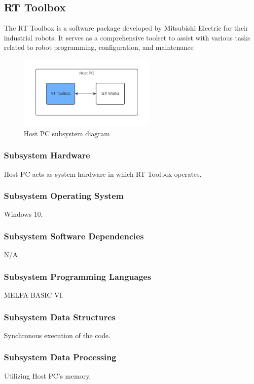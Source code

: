 \subsection{RT Toolbox}
The RT Toolbox is a software package developed by Mitsubishi Electric for their industrial robots. It serves as a comprehensive toolset to assist with various tasks related to robot programming, configuration, and maintenance

\begin{figure}[h!]
	\centering
 	\includegraphics[width=0.60\textwidth]{images/RT_toolbox_Host.png}
 \caption{Host PC subsystem diagram}
\end{figure}

\subsubsection{Subsystem Hardware}
Host PC acts as system hardware in which RT Toolbox operates.

\subsubsection{Subsystem Operating System}
Windows 10.

\subsubsection{Subsystem Software Dependencies}
N/A

\subsubsection{Subsystem Programming Languages}
MELFA BASIC VI.

\subsubsection{Subsystem Data Structures}
Synchronous execution of the code.

\subsubsection{Subsystem Data Processing}
Utilizing Host PC's memory.

